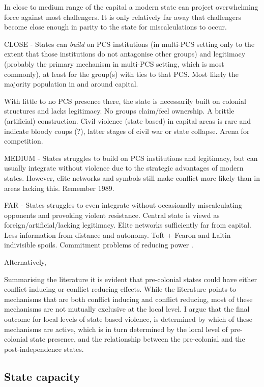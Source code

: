 \documentclass[12pt]{article}
\begin{document}
In close to medium range of the capital a modern state can project overwhelming
force against most challengers. It is only relatively far away that challengers
become close enough in parity to the state for miscalculations to occur. 

CLOSE - States can \textit{build} on PCS institutions (in multi-PCS setting only
to the extent that those institutions do not antagonise other groups) and
legitimacy (probably the primary mechanism in multi-PCS setting, which is most
commonly), at least for the group(s) with ties to that PCS. Most likely the
majority population in and around capital. 

With little to no PCS presence there, the state is necessarily built on colonial
structures and lacks legitimacy. No groups claim/feel ownership. A brittle
(artificial) construction. Civil violence (state based) in capital areas is rare
and indicate bloody coups (?), latter stages of civil war or state collapse.
Arena for competition.

MEDIUM - States struggles to build on PCS institutions and legitimacy, but can
usually integrate without violence due to the strategic advantages of modern
states. However, elite networks and symbols still make conflict more likely
than in areas lacking this. Remember 1989.

FAR - States struggles to even integrate without occasionally miscalculating
opponents and provoking violent resistance. Central state is viewd as
foreign/artificial/lacking legitimacy. Elite networks sufficiently far from
capital. Less information from distance and autonomy. Toft + Fearon and Laitin
indivisible spoils. Commitment problems of reducing power .

Alternatively, 

Summarising the literature it is evident that pre-colonial states could have
either conflict inducing or conflict reducing effects. While the literature
points to mechanisms that are both conflict inducing and conflict reducing, most
of these mechanisms are not mutually exclusive at the local level. I argue that
the final outcome for local levels of state based violence, is determined by
which of these mechanisms are active, which is in turn determined by the local
level of pre-colonial state presence, and the relationship between the
pre-colonial and the post-independence states.

\subsection{State capacity} \label{State capacity}
\end{document}
